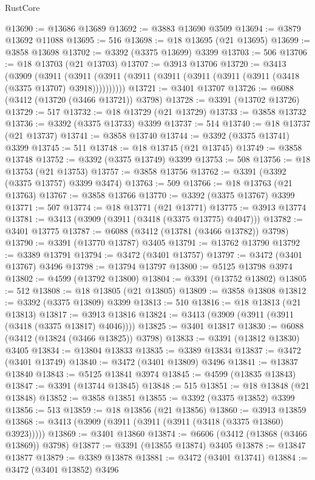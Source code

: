 \begin{lexlean}{RustCore}
\begin{coremodule}
@13690 := @13686 @13689
@13692 := @3883 @13690 @3509
@13694 := @3879 @13692 @11088
@13695 := 516
@13698 := @18 @13695 (@21 @13695)
@13699 := @3858 @13698
@13702 := @3392 (@3375 @13699) @3399
@13703 := 506
@13706 := @18 @13703 (@21 @13703)
@13707 := @3913 @13706
@13720 := @3413
    (@3909
      (@3911 (@3911 (@3911 (@3911 (@3911 (@3911 (@3911 (@3911 (@3418 (@3375 @13707) @3918))))))))))
@13721 := @3401 @13707
@13726 := @6088 (@3412 (@13720 (@3466 @13721)) @3798)
@13728 := @3391 (@13702 @13726)
@13729 := 517
@13732 := @18 @13729 (@21 @13729)
@13733 := @3858 @13732
@13736 := @3392 (@3375 @13733) @3399
@13737 := 514
@13740 := @18 @13737 (@21 @13737)
@13741 := @3858 @13740
@13744 := @3392 (@3375 @13741) @3399
@13745 := 511
@13748 := @18 @13745 (@21 @13745)
@13749 := @3858 @13748
@13752 := @3392 (@3375 @13749) @3399
@13753 := 508
@13756 := @18 @13753 (@21 @13753)
@13757 := @3858 @13756
@13762 := @3391 (@3392 (@3375 @13757) @3399 @3474)
@13763 := 509
@13766 := @18 @13763 (@21 @13763)
@13767 := @3858 @13766
@13770 := @3392 (@3375 @13767) @3399
@13771 := 507
@13774 := @18 @13771 (@21 @13771)
@13775 := @3913 @13774
@13781 := @3413 (@3909 (@3911 (@3418 (@3375 @13775) @4047)))
@13782 := @3401 @13775
@13787 := @6088 (@3412 (@13781 (@3466 @13782)) @3798)
@13790 := @3391 (@13770 @13787) @3405
@13791 := @13762 @13790
@13792 := @3389 @13791
@13794 := @3472 (@3401 @13757)
@13797 := @3472 (@3401 @13767) @3496
@13798 := @13794 @13797
@13800 := @5125 @13798 @3974
@13802 := @4599 (@13792 @13800)
@13804 := @3391 (@13752 @13802)
@13805 := 512
@13808 := @18 @13805 (@21 @13805)
@13809 := @3858 @13808
@13812 := @3392 (@3375 @13809) @3399
@13813 := 510
@13816 := @18 @13813 (@21 @13813)
@13817 := @3913 @13816
@13824 := @3413 (@3909 (@3911 (@3911 (@3418 (@3375 @13817) @4046))))
@13825 := @3401 @13817
@13830 := @6088 (@3412 (@13824 (@3466 @13825)) @3798)
@13833 := @3391 (@13812 @13830) @3405
@13834 := @13804 @13833
@13835 := @3389 @13834
@13837 := @3472 (@3401 @13749)
@13840 := @3472 (@3401 @13809) @3496
@13841 := @13837 @13840
@13843 := @5125 @13841 @3974
@13845 := @4599 (@13835 @13843)
@13847 := @3391 (@13744 @13845)
@13848 := 515
@13851 := @18 @13848 (@21 @13848)
@13852 := @3858 @13851
@13855 := @3392 (@3375 @13852) @3399
@13856 := 513
@13859 := @18 @13856 (@21 @13856)
@13860 := @3913 @13859
@13868 := @3413 (@3909 (@3911 (@3911 (@3911 (@3418 (@3375 @13860) @3923)))))
@13869 := @3401 @13860
@13874 := @6606 (@3412 (@13868 (@3466 @13869)) @3798)
@13877 := @3391 (@13855 @13874) @3405
@13878 := @13847 @13877
@13879 := @3389 @13878
@13881 := @3472 (@3401 @13741)
@13884 := @3472 (@3401 @13852) @3496

\end{coremodule}
\end{lexlean}
